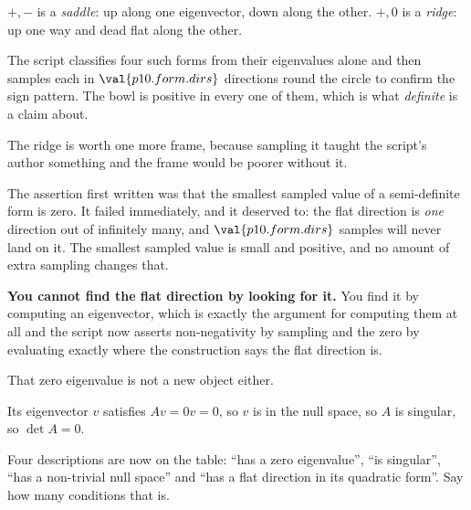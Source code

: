 \begin{fr}
\begin{ansblock}
$+,-$ is a \emph{saddle}: up along one eigenvector, down along the other.
$+,0$ is a \emph{ridge}: up one way and dead flat along the other.
\end{ansblock}

The script classifies four such forms from their eigenvalues alone and then
samples each in $\val{p10.form.dirs}$ directions round the circle to confirm
the sign pattern. The bowl is positive in every one of them, which is what
\emph{definite} is a claim about.
\end{fr}

\begin{fr}
The ridge is worth one more frame, because sampling it taught the script's
author something and the frame would be poorer without it.

The assertion first written was that the smallest sampled value of a
semi-definite form is zero. It failed immediately, and it deserved to: the flat
direction is \emph{one} direction out of infinitely many, and
$\val{p10.form.dirs}$ samples will never land on it. The smallest sampled value
is small and positive, and no amount of extra sampling changes that.

\textbf{You cannot find the flat direction by looking for it.} You find it by
computing an eigenvector, which is exactly the argument for computing them at
all \dash{} and the script now asserts non-negativity by sampling and the zero
by evaluating exactly where the construction says the flat direction is.
\end{fr}


\begin{fr}
That zero eigenvalue is not a new object either.

Its eigenvector $v$ satisfies $Av = 0v = 0$, so $v$ is in the null space, so
$A$ is singular, so $\det A = 0$.

Four descriptions are now on the table: \enquote{has a zero eigenvalue},
\enquote{is singular}, \enquote{has a non-trivial null space} and \enquote{has
a flat direction in its quadratic form}. Say how many conditions that is.
\dotline
\nextframe
\end{fr}

